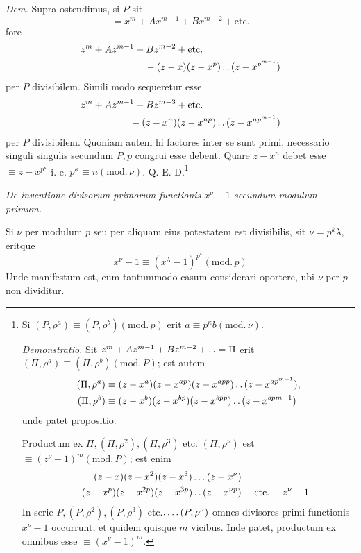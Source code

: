 \emph{Dem.} Supra ostendimus, si $P$ sit
\[
=x^m+Ax^{m-1}+Bx^{m-2}+\text{etc.}
\]
fore
\[
\begin{aligned}
z^m+Az^{m-1}+Bz^{m-2}+\text{etc.}\qquad\qquad\qquad\qquad&\\
{}-(z-x)(z-x^p)\mathinner{.\,.}(z-x^{p^{m-1}})&
\end{aligned}
\]
per $P$ divisibilem. Simili modo sequeretur esse
\[
\begin{aligned}
z^m+Az^{m-1}+Bz^{m-3}+\text{etc.}\qquad\qquad\qquad\qquad&\\
{}-(z-x^n)(z-x^{np})\mathinner{.\,.}(z-x^{np^{m-1}})&
\end{aligned}
\]
per $P$ divisibilem. Quoniam autem hi factores inter se sunt primi, necessario singuli singulis secundum $P,p$ congrui esse debent. Quare $z-x^n$ debet esse $\equiv z-x^{p^\kappa}$ i. e. $p^\kappa\equiv n(\mathrm{mod.}\,\nu)$. Q. E. D.\begingroup\renewcommand{\thefootnote}{*)}\footnote{Si $(P,\rho^a)\equiv(P,\rho^b)(\mathrm{mod.}\,p)$ erit $a\equiv p^\kappa b(\mathrm{mod.}\,\nu)$.

\emph{Demonstratio.} Sit $z^m+Az^{m-1}+Bz^{m-2}+\mathinner{.\,.}=\Pi$ erit $(\Pi,\rho^a)\equiv(\Pi,\rho^b)(\mathrm{mod.}\,P)$; est autem
\[
\begin{aligned}
(\Pi,\rho^a)&\equiv(z-x^a)(z-x^{ap})(z-x^{app})\mathinner{.\,.}(z-x^{ap^{m-1}}),\\
(\Pi,\rho^b)&\equiv(z-x^b)(z-x^{bp})(z-x^{bpp})\mathinner{.\,.}(z-x^{bpm-1})
\end{aligned}
\]
unde patet propositio.

Productum ex $\Pi,(\Pi,\rho^2),(\Pi,\rho^3)$ etc. $(\Pi,\rho^\nu)$ est $\equiv(z^\nu-1)^m(\mathrm{mod.}\,P)$; est enim
\[
\begin{aligned}
(z-x)(z-x^2)(z-x^3)\ldots(z-x^\nu)&\\
{}\equiv(z-x^p)(z-x^{2p})(z-x^{3p})\mathinner{.\,.}(z-x^{\nu p})&\equiv\text{etc.}\equiv z^\nu-1
\end{aligned}
\]
In serie $P,(P,\rho^2),(P,\rho^3)$ etc.$\mathinner{.\,.\,.\,.}(P,\rho^\nu)$ omnes divisores primi functionis $x^\nu-1$ occurrunt, et quidem quisque $m$ vicibus. Inde patet, productum ex omnibus esse $\equiv(x^\nu-1)^m$.}\endgroup

\par\medskip{}
\begin{center}\emph{De inventione divisorum primorum functionis $x^\nu-1$ secundum modulum primum.}\end{center}
Si $\nu$ per modulum $p$ seu per aliquam eius potestatem est divisibilis, sit $\nu=p^k\lambda$, eritque
\[
x^\nu-1\equiv(x^\lambda-1)^{p^k}(\mathrm{mod.}\,p)
\]
Unde manifestum est, eum tantummodo casum considerari oportere, ubi $\nu$ per $p$ non dividitur.

